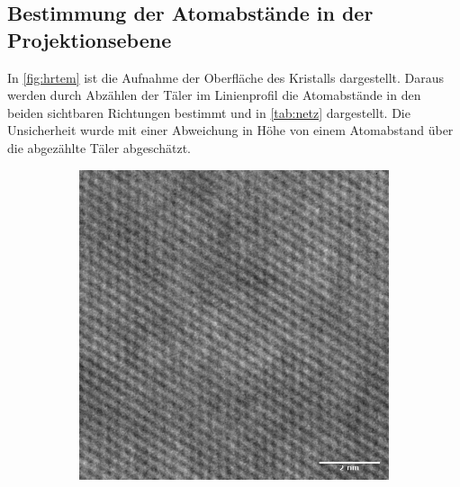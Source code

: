  \subsection{Bestimmung der Atomabstände in der Projektionsebene}

 In \cref{fig:hrtem} ist die Aufnahme der Oberfläche des Kristalls dargestellt.
 Daraus werden durch Abzählen der Täler im Linienprofil die Atomabstände in den beiden sichtbaren Richtungen bestimmt und in \cref{tab:netz} dargestellt.
 Die Unsicherheit wurde mit einer Abweichung in Höhe von einem Atomabstand über die abgezählte Täler abgeschätzt.

	\begin{figure}[H]
		\centering
	\begin{subfigure}[b]{0.40\textwidth}
        \centering
				\includegraphics[width= 1 \linewidth]{img/hrtem_zoomzoom}
				\caption{}
        \label{fig:hrtem_img}
		\end{subfigure}


\end{figure}
